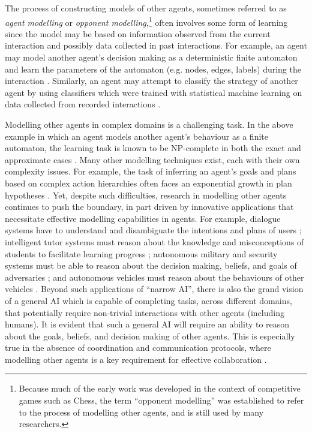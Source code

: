 \documentclass[final,1p,times,authoryear]{elsarticle}
\begin{document}
The process of constructing models of other agents, sometimes referred to as \emph{agent modelling} or \emph{opponent modelling},\footnote{Because much of the early work was developed in the context of competitive games such as Chess, the term ``opponent modelling'' was established to refer to the process of modelling other agents, and is still used by many researchers.} often involves some form of learning since the model may be based on information observed from the current interaction and possibly data collected in past interactions. For example, an agent may model another agent's decision making as a deterministic finite automaton and learn the parameters of the automaton (e.g. nodes, edges, labels) during the interaction \citep{cm1998dfa}. Similarly, an agent may attempt to classify the strategy of another agent by using classifiers which were trained with statistical machine learning on data collected from recorded interactions \citep{wm2009}.

Modelling other agents in complex domains is a challenging task. In the above example in which an agent models another agent's behaviour as a finite automaton, the learning task is known to be NP-complete in both the exact and approximate cases \citep{pitt1989,g1978}. Many other modelling techniques exist, each with their own complexity issues. For example, the task of inferring an agent's goals and plans based on complex action hierarchies often faces an exponential growth in plan hypotheses \citep{g2004}. Yet, despite such difficulties, research in modelling other agents continues to push the boundary, in part driven by innovative applications that necessitate effective modelling capabilities in agents. For example, dialogue systems have to understand and disambiguate the intentions and plans of users \citep{gs1986,la1984}; intelligent tutor systems must reason about the knowledge and misconceptions of students to facilitate learning progress \citep{mvgb2000,abcl1990}; autonomous military and security systems must be able to reason about the decision making, beliefs, and goals of adversaries \citep{bkaa2015,jlm2005,t1995rec}; and autonomous vehicles must reason about the behaviours of other vehicles \citep{bls2009}. Beyond such applications of ``narrow AI'', there is also the grand vision of a general AI which is capable of completing tasks, across different domains, that potentially require non-trivial interactions with other agents (including humans). It is evident that such a general AI will require an ability to reason about the goals, beliefs, and decision making of other agents. This is especially true in the absence of coordination and communication protocols, where modelling other agents is a key requirement for effective collaboration \citep{skkr2010,rw2003}.
\end{document}
